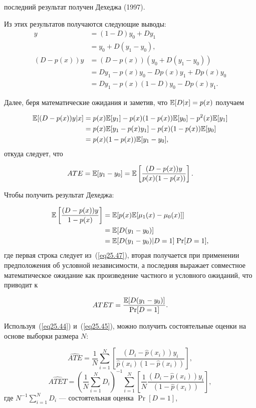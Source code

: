 последний результат получен Дехеджа (1997).

Из этих результатов получаются следующие выводы:
\begin{align}
\label{eq25.46}
y & = (1-D)y_0 + Dy_1  \nonumber \\
& = y_0 + D(y_1 - y_0), \nonumber \\
(D - p(x))y & = (D - p(x))(y_0 + D(y_1 - y_0))  \nonumber \\
& = Dy_1 - p(x) y_0 - D p(x) y_1 + D p(x) y_0 \nonumber \\
& = Dy_1 - p(x) (1-D) y_0 - D p(x) y_1.
\end{align}

Далее, беря математические ожидания и заметив, что $\mathbb{E}[D|x] = p(x)$ получаем

\begin{align}
\label{eq25.47}
\mathbb{E}[(D - p(x)) y | x] & = p(x) \mathbb{E}[y_1] - p(x)(1 - p(x)) \mathbb{E}[y_0] - p^2(x) \mathbb{E}[y_1]  \\
& = p(x)\mathbb{E}[y_1 - p(x)y_1] - p(x)(1-p(x))\mathbb{E}[y_0] \nonumber \\
& = p(x)(1-p(x)) \mathbb{E}[y_1 - y_0],  \nonumber 
\end{align}
откуда следует, что 

$$
ATE = \mathbb{E}[y_1 - y_0] = \mathbb{E} \left[ \frac{(D - p(x)) y}{ p(x) (1 - p(x))} \right].
$$

Чтобы получить результат Дехеджа:

\begin{align}
\label{eq25.48}
\mathbb{E} \left[ \frac{(D - p(x)) y}{1 - p(x)} \right] & = \mathbb{E}[p(x) \mathbb{E} [\mu_1(x) - \mu_0 (x)]]  \\
& = \mathbb{E}[D (y_1 - y_0)] \nonumber \\
& = \mathbb{E}[D (y_1 - y_0) | D = 1] \; \mathrm{Pr} [D = 1],  \nonumber
\end{align}
где первая строка следует из~(\ref{eq25.47}), вторая получается при применении предположения об условной независимости, а последняя выражает совместное математическое ожидание как произведение частного и условного ожиданий, что приводит к

$$
ATET = \frac{\mathbb{E} [D (y_1 - y_0)]}{\mathrm{Pr} [D = 1]}.
$$

Используя~(\ref{eq25.44}) и~(\ref{eq25.45}), можно получить состоятельные оценки на основе выборки размера $N$:

\begin{equation}
\label{eq25.49}
\widehat{ATE} = \frac1N \sum_{i=1}^N \left[  \frac{(D_i - \hat p(x_i)) y_i}{\hat p(x_i)(1 - \hat p(x_i))}  \right],
\end{equation}
\begin{equation}
\label{eq25.50}
\widehat{ATET} = \left(  \frac1N \sum_{i=1}^N D_i  \right)^{-1}  \sum_{i=1}^N \left[ \frac1N \frac{(D_i - \hat p(x_i)) y_i}{(1 - \hat p(x_i))}  \right],
\end{equation}
где $N^{-1} \sum_{i=1}^N D_i$ --- состоятельная оценка $\Pr[D=1]$, 

